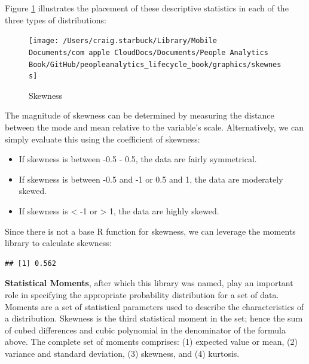 \documentclass[]{book}
\newenvironment{Shaded}{\begin{snugshade}}{\end{snugshade}}
\newcommand{\CommentTok}[1]{\textcolor[rgb]{0.56,0.35,0.01}{\textit{#1}}}
\newcommand{\DecValTok}[1]{\textcolor[rgb]{0.00,0.00,0.81}{#1}}
\newcommand{\KeywordTok}[1]{\textcolor[rgb]{0.13,0.29,0.53}{\textbf{#1}}}
\newcommand{\NormalTok}[1]{#1}
\newcommand{\OperatorTok}[1]{\textcolor[rgb]{0.81,0.36,0.00}{\textbf{#1}}}
\providecommand{\tightlist}{%
  \setlength{\itemsep}{0pt}\setlength{\parskip}{0pt}}
\begin{document}
Figure \ref{fig:skewness} illustrates the placement of these descriptive statistics in each of the three types of distributions:

\begin{figure}

{\centering \texttt{[image: /Users/craig.starbuck/Library/Mobile Documents/com~apple~CloudDocs/Documents/People Analytics Book/GitHub/peopleanalytics\_lifecycle\_book/graphics/skewness]} 

}

\caption{Skewness}\label{fig:skewness}
\end{figure}

The magnitude of skewness can be determined by measuring the distance between the mode and mean relative to the variable's scale. Alternatively, we can simply evaluate this using the coefficient of skewness:

\begin{itemize}
\tightlist
\item
  If skewness is between -0.5 - 0.5, the data are fairly symmetrical.
\item
  If skewness is between -0.5 and -1 or 0.5 and 1, the data are moderately skewed.
\item
  If skewness is \textless{} -1 or \textgreater{} 1, the data are highly skewed.
\end{itemize}

Since there is not a base R function for skewness, we can leverage the moments library to calculate skewness:

\begin{Shaded}
\end{Shaded}

\begin{verbatim}
## [1] 0.562
\end{verbatim}

\textbf{Statistical Moments}, after which this library was named, play an important role in specifying the appropriate probability distribution for a set of data. Moments are a set of statistical parameters used to describe the characteristics of a distribution. Skewness is the third statistical moment in the set; hence the sum of cubed differences and cubic polynomial in the denominator of the formula above. The complete set of moments comprises: (1) expected value or mean, (2) variance and standard deviation, (3) skewness, and (4) kurtosis.
\end{document}
